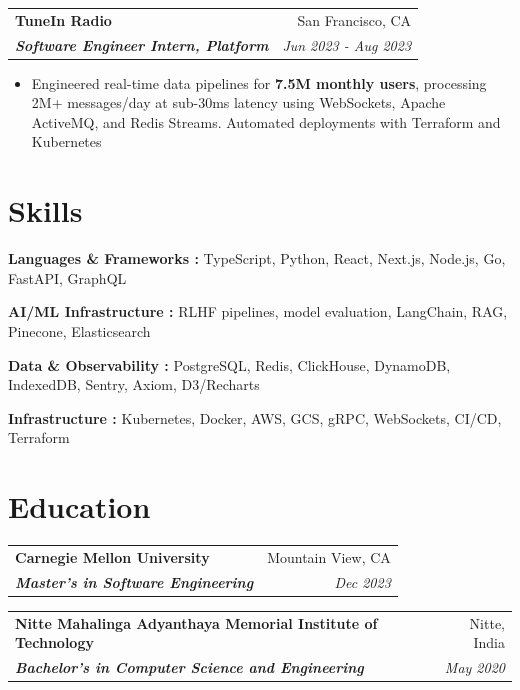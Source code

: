 \documentclass[letterpaper]{article}
\makeatletter
\newcommand{\resumeItemWithoutTitle}[1]{
  \item\small{
    {#1 \vspace{4pt}}
  }
}
\newcommand{\resumeSubheading}[4]{
    \begin{tabular*}{\textwidth}{l@{\extracolsep{\fill}}r}
        \textbf{#1} & #2 \\
        \textbf{\textit{#3}} & \textit{\small #4} \\
    \end{tabular*}\vspace{2pt}
}
\newcommand{\shortSection}[1]{
    \vspace{-2pt}
    \section{#1}
}
\newcommand*{\skill}[2]{
  \textbf{#1 : }#2 \\
  \vspace{1pt}
}
\newcommand{\resumeItemListStart}{\begin{itemize}}
\newcommand{\resumeItemListEnd}{\end{itemize}}
\makeatother
\begin{document}
\vspace{3pt}
\resumeSubheading
{TuneIn Radio}{San Francisco, CA}
{Software Engineer Intern, Platform}{Jun 2023 - Aug 2023}
\resumeItemListStart
\resumeItemWithoutTitle{Engineered real-time data pipelines for \textbf{7.5M monthly users}, processing 2M+ messages/day at sub-30ms latency using WebSockets, Apache ActiveMQ, and Redis Streams. Automated deployments with Terraform and Kubernetes}
\resumeItemListEnd

\shortSection{Skills}
\vspace{3pt}
\skill {Languages \& Frameworks}{TypeScript, Python, React, Next.js, Node.js, Go, FastAPI, GraphQL}
\skill {AI/ML Infrastructure}{RLHF pipelines, model evaluation, LangChain, RAG, Pinecone, Elasticsearch}
\skill {Data \& Observability}{PostgreSQL, Redis, ClickHouse, DynamoDB, IndexedDB, Sentry, Axiom, D3/Recharts}
\skill {Infrastructure}{Kubernetes, Docker, AWS, GCS, gRPC, WebSockets, CI/CD, Terraform}

\shortSection{Education}
\vspace{3pt}
\resumeSubheading
{Carnegie Mellon University}{Mountain View, CA}
{Master's in Software Engineering}{Dec 2023}

\vspace{3pt}
\resumeSubheading
{Nitte Mahalinga Adyanthaya Memorial Institute of Technology}{Nitte, India}
{Bachelor's in Computer Science and Engineering}{May 2020}
\end{document}

